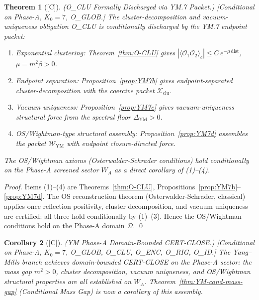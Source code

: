 \documentclass[12pt,oneside]{amsbook}
\theoremstyle{plain}
\newtheorem{theorem}{Theorem}[section]
\newtheorem{corollary}[theorem]{Corollary}
\theoremstyle{definition}
\theoremstyle{remark}
\newcommand{\status}[1]{\textup{[#1]}}
\begin{document}
\begin{theorem}[\status{C}]\label{thm:O-CLU-via-YM7}
\textup{(O\_CLU Formally Discharged via YM.7 Packet.)}
\textup{[Conditional on Phase-A, $K_0=7$, O\_GLOB.]}
The cluster-decomposition and vacuum-uniqueness obligation O\_CLU
is conditionally discharged by the YM.7 endpoint packet:
\begin{enumerate}[label=\textup{(\arabic*)}]
 \item \emph{Exponential clustering}:
 Theorem~\ref{thm:O-CLU} gives
 $|\langle\mathcal{O}_1\mathcal{O}_2\rangle_c|
 \leq C\,e^{-\mu\,\mathrm{dist}}$,
 $\mu = m^2\beta > 0$.
 \item \emph{Endpoint separation}: Proposition~\ref{prop:YM7b}
 gives endpoint-separated cluster-decomposition with the
 coercive packet $\mathcal{X}_{\mathrm{clu}}$.
 \item \emph{Vacuum uniqueness}: Proposition~\ref{prop:YM7c}
 gives vacuum-uniqueness structural force from the spectral
 floor $\Delta_{\mathrm{YM}} > 0$.
 \item \emph{OS/Wightman-type structural assembly}:
 Proposition~\ref{prop:YM7d} assembles the packet
 $\mathcal{W}_{\mathrm{YM}}$ with endpoint closure-directed force.
\end{enumerate}
The OS/Wightman axioms (Osterwalder-Schrader conditions) hold
conditionally on the Phase-A screened sector $W_A$ as a
direct corollary of (1)--(4).
\end{theorem}

\begin{proof}
Items (1)--(4) are Theorems~\ref{thm:O-CLU},
Propositions~\ref{prop:YM7b}--\ref{prop:YM7d}. The OS
reconstruction theorem (Osterwalder-Schrader, classical) applies
once reflection positivity, cluster decomposition, and vacuum
uniqueness are certified: all three hold conditionally by (1)--(3).
Hence the OS/Wightman conditions hold on the Phase-A domain
$\mathcal{D}$. \qed
\end{proof}

\begin{corollary}[\status{C}]\label{cor:YM-phase-A-CERT-CLOSE}
\textup{(YM Phase-A Domain-Bounded CERT-CLOSE.)}
\textup{[Conditional on Phase-A, $K_0=7$, O\_GLOB, O\_CLU, O\_ENC, O\_RIG, O\_ID.]}
The Yang--Mills branch achieves domain-bounded CERT-CLOSE on the
Phase-A sector: the mass gap $m^2 > 0$, cluster decomposition,
vacuum uniqueness, and OS/Wightman structural properties are all
established on $W_A$.
Theorem~\ref{thm:YM-cond-mass-gap} (Conditional Mass Gap)
is now a corollary of this assembly.
\end{corollary}
\end{document}
